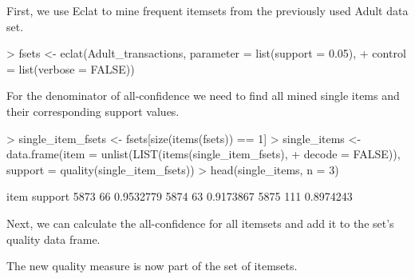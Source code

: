 \documentclass[10pt,a4paper]{article}
\begin{document}
First, we use Eclat to mine frequent itemsets from the previously used
Adult data set.

\begin{Schunk}
\begin{Sinput}
> fsets <- eclat(Adult_transactions, parameter = list(support = 0.05), 
+     control = list(verbose = FALSE))
\end{Sinput}
\end{Schunk}

For the denominator of all-confidence we need to find all mined single
items and their corresponding support values.

\begin{Schunk}
\begin{Sinput}
> single_item_fsets <- fsets[size(items(fsets)) == 1]
> single_items <- data.frame(item = unlist(LIST(items(single_item_fsets), 
+     decode = FALSE)), support = quality(single_item_fsets))
> head(single_items, n = 3)
\end{Sinput}
\begin{Soutput}
     item   support
5873   66 0.9532779
5874   63 0.9173867
5875  111 0.8974243

\end{Soutput}
\end{Schunk}

Next, we can calculate the all-confidence for all itemsets and add it to
the set's quality data frame.

\begin{Schunk}
\end{Schunk}

The new quality measure is now part of the set of itemsets.
\end{document}
